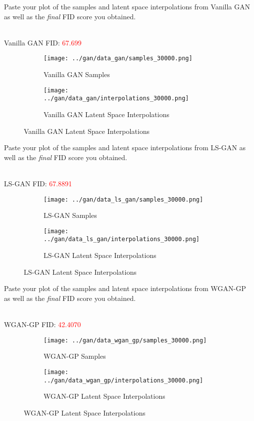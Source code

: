 \documentclass[11pt,addpoints,answers]{exam}
\numberwithin{equation}{section} %
\numberwithin{figure}{section} %
\numberwithin{table}{section} %
\begin{document}
\begin{questions}
\question Paste your plot of the samples and latent space interpolations from Vanilla GAN as well as the \textit{final} FID score you obtained. 
\begin{solution}
\\
Vanilla GAN FID: \textcolor{red}{67.699}
\\
\begin{figure}[H]
    \centering
    \begin{subfigure}[b]{0.48\linewidth}
        \texttt{[image: ../gan/data\_gan/samples\_30000.png]}
        \caption{Vanilla GAN Samples}
    \end{subfigure}
    \begin{subfigure}[b]{0.48\linewidth}
        \texttt{[image: ../gan/data\_gan/interpolations\_30000.png]}
        \caption{Vanilla GAN Latent Space Interpolations}
    \end{subfigure}
\end{figure}
\end{solution}
\question Paste your plot of the samples and latent space interpolations from LS-GAN as well as the \textit{final} FID score you obtained. 
\begin{solution}
\\
LS-GAN FID: \textcolor{red}{67.8891}
\\
\begin{figure}[H]
    \centering
    \begin{subfigure}[b]{0.48\linewidth}
        \texttt{[image: ../gan/data\_ls\_gan/samples\_30000.png]}
        \caption{LS-GAN Samples}
    \end{subfigure}
    \begin{subfigure}[b]{0.48\linewidth}
        \texttt{[image: ../gan/data\_ls\_gan/interpolations\_30000.png]}
        \caption{LS-GAN Latent Space Interpolations}
    \end{subfigure}
\end{figure}
\end{solution}
\question Paste your plot of the samples and latent space interpolations from WGAN-GP as well as the \textit{final} FID score you obtained. 
\\
\begin{solution}
\\
WGAN-GP FID: \textcolor{red}{42.4070}
\\
\begin{figure}[H]
    \centering
    \begin{subfigure}[b]{0.48\linewidth}
        \texttt{[image: ../gan/data\_wgan\_gp/samples\_30000.png]}
        \caption{WGAN-GP Samples}
    \end{subfigure}
    \begin{subfigure}[b]{0.48\linewidth}
        \texttt{[image: ../gan/data\_wgan\_gp/interpolations\_30000.png]}
        \caption{WGAN-GP Latent Space Interpolations}
    \end{subfigure}
\end{figure}  
\end{solution}
\end{questions}
\clearpage
\end{document}
